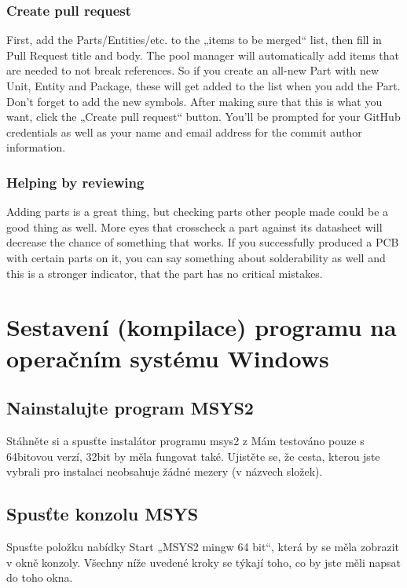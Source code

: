 \documentclass[letterpaper,10pt,czech]{sphinxmanual}
\begin{document}
\subsection{Create pull request}
\label{\detokenize{pool-contribute:create-pull-request}}
First, add the Parts/Entities/etc. to the „items to be merged“ list,
then fill in Pull Request title and body. The pool manager will
automatically add items that are needed to not break references. So if
you create an all-new Part with new Unit, Entity and Package, these will
get added to the list when you add the Part. Don’t forget to add the new
symbols. After making sure that this is what you want, click the „Create
pull request“ button. You’ll be prompted for your GitHub credentials as
well as your name and email address for the commit author information.


\subsection{Helping by reviewing}
\label{\detokenize{pool-contribute:helping-by-reviewing}}
Adding parts is a great thing, but checking parts other people made could be a
good thing as well. More eyes that crosscheck a part against its datasheet will
decrease the chance of something that works. If you successfully produced a PCB
with certain parts on it, you can say something about solderability as well and
this is a stronger indicator, that the part has no critical mistakes.


\chapter{Sestavení (kompilace) programu na operačním systému Windows}
\label{\detokenize{build-win32:sestaveni-kompilace-programu-na-operacnim-systemu-windows}}\label{\detokenize{build-win32::doc}}

\section{Nainstalujte program MSYS2}
\label{\detokenize{build-win32:nainstalujte-program-msys2}}
Stáhněte si a spusťte instalátor programu msys2 z  Mám
testováno pouze s 64bitovou verzí, 32bit by měla fungovat také. Ujistěte se, že cesta, kterou jste vybrali pro instalaci neobsahuje žádné mezery (v názvech složek).


\section{Spusťte konzolu MSYS}
\label{\detokenize{build-win32:spustte-konzolu-msys}}
Spusťte položku nabídky Start „MSYS2 mingw 64 bit“, která by se měla zobrazit
v okně konzoly. Všechny níže uvedené kroky se týkají toho, co by jste měli napsat
do toho okna.
\end{document}
